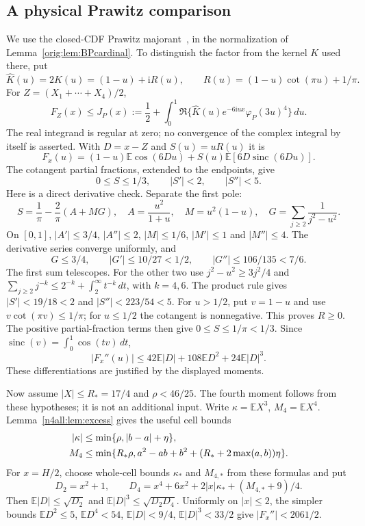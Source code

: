 \documentclass[11pt,a4paper]{article}
\numberwithin{equation}{section}
\theoremstyle{definition}
\theoremstyle{remark}
\newcommand{\E}{\mathbb E}
\newcommand{\ii}{\mathrm i}
\begin{document}
\subsection{A physical Prawitz comparison}
We use the closed-CDF Prawitz majorant~\cite{Prawitz1972}, in the
normalization of Lemma~\ref{orig:lem:BPcardinal}. To distinguish the
factor from the kernel $K$ used there, put
\[
 \widehat K(u)=2K(u)=(1-u)+\ii R(u),\qquad
 R(u)=(1-u)\cot(\pi u)+1/\pi.
\]
For $Z=(X_1+\cdots+X_4)/2$,
\begin{equation}\label{n4all:eq:prawitz}
 F_Z(x)\le J_P(x):=\frac12+
 \int_0^1\Re\{\widehat K(u)e^{-6\ii ux}\varphi_P(3u)^4\}\,du.
\end{equation}
The real integrand is regular at zero; no convergence of the complex
integral by itself is asserted. With $D=x-Z$ and $S(u)=uR(u)$ it is
\[
 F_x(u)=(1-u)\E\cos(6Du)+S(u)\E[6D\operatorname{sinc}(6Du)].
\]
The cotangent partial fractions, extended to the endpoints, give
\[
 0\le S\le1/3,\qquad |S'|<2,\qquad |S''|<5.
\]
Here is a direct derivative check. Separate the first pole:
\[
 S=\frac1\pi-\frac2\pi(A+MG),\quad
 A=\frac{u^2}{1+u},\quad M=u^2(1-u),\quad
 G=\sum_{j\ge2}\frac1{j^2-u^2}.
\]
On $[0,1]$, $|A'|\le3/4$, $|A''|\le2$, $|M|\le1/6$,
$|M'|\le1$ and $|M''|\le4$. The derivative series converge
uniformly, and
\[
 G\le3/4,\qquad |G'|\le10/27<1/2,\qquad
 |G''|\le106/135<7/6.
\]
The first sum telescopes. For the other two use
$j^2-u^2\ge3j^2/4$ and
$\sum_{j\ge2}j^{-k}\le2^{-k}+\int_2^\infty t^{-k}\,dt$,
with $k=4,6$. The product rule gives
$|S'|<19/18<2$ and $|S''|<223/54<5$.
For $u>1/2$, put $v=1-u$ and use
$v\cot(\pi v)\le1/\pi$; for $u\le1/2$ the cotangent is
nonnegative. This proves $R\ge0$. The positive partial-fraction
terms then give $0\le S\le1/\pi<1/3$.
Since $\operatorname{sinc}(v)=\int_0^1\cos(tv)\,dt$,
\begin{equation}\label{n4all:eq:integrand-curvature}
 |F_x''(u)|\le42\E|D|+108\E D^2+24\E|D|^3.
\end{equation}
These differentiations are justified by the displayed moments.

Now assume $|X|\le R_*=17/4$ and $\rho<46/25$.
The fourth moment follows from these hypotheses; it is not an
additional input. Write $\kappa=\E X^3$, $M_4=\E X^4$.
Lemma~\ref{n4all:lem:excess} gives the useful cell bounds
\begin{align}
 |\kappa|&\le\min\{\rho,|b-a|+\eta\},\notag\\
 M_4&\le\min\{R_*\rho, a^2-ab+b^2+
                         (R_*+2\max(a,b))\eta\}.
 \label{n4all:eq:local-moments}
\end{align}
For $x=H/2$, choose whole-cell bounds $\kappa_*$ and $M_{4,*}$
from these formulas and put
\[
 D_2=x^2+1,\qquad
 D_4=x^4+6x^2+2|x|\kappa_*+(M_{4,*}+9)/4.
\]
Then $\E|D|\le\sqrt{D_2}$ and
$\E|D|^3\le\sqrt{D_2D_4}$. Uniformly on $|x|\le2$, the simpler
bounds $\E D^2\le5$, $\E D^4<54$, $\E|D|<9/4$,
$\E|D|^3<33/2$ give $|F_x''|<2061/2$.
\end{document}
